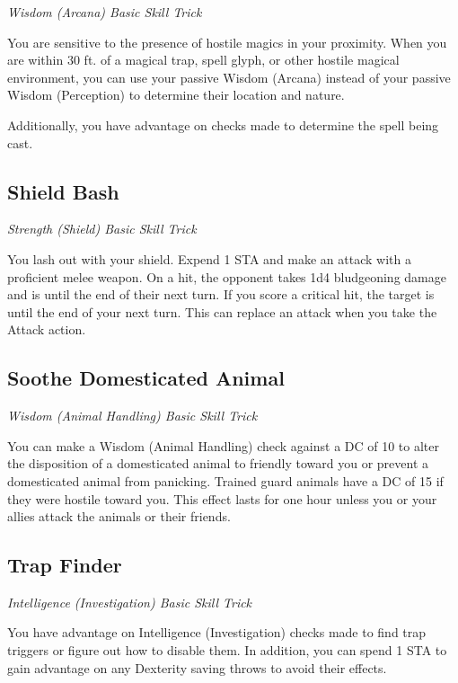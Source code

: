\textit{Wisdom (Arcana) Basic Skill Trick}

You are sensitive to the presence of hostile magics in your proximity. When you are within 30 ft. of a magical trap, spell glyph, or other hostile magical environment, you can use your passive Wisdom (Arcana) instead of your passive Wisdom (Perception) to determine their location and nature.

Additionally, you have advantage on checks made to determine the spell being cast.

\subsection{Shield Bash}

\textit{Strength (Shield) Basic Skill Trick}

You lash out with your shield. Expend 1 STA and make an attack with a proficient melee weapon. On a hit, the opponent takes 1d4 bludgeoning damage and is  until the end of their next turn. If you score a critical hit, the target is  until the end of your next turn. This can replace an attack when you take the Attack action.

\subsection{Soothe Domesticated Animal}\label{st:soothe-domesticated-animal}

\textit{Wisdom (Animal Handling) Basic Skill Trick}

You can make a Wisdom (Animal Handling) check against a DC of 10 to alter the disposition of a domesticated animal to friendly toward you or prevent a domesticated animal from panicking. Trained guard animals have a DC of 15 if they were hostile toward you. This effect lasts for one hour unless you or your allies attack the animals or their friends.

\subsection{Trap Finder}\label{st:trap-finder}

\textit{Intelligence (Investigation) Basic Skill Trick}

You have advantage on Intelligence (Investigation) checks made to find trap triggers or figure out how to disable them. In addition, you can spend 1 STA to gain advantage on any Dexterity saving throws to avoid their effects.

